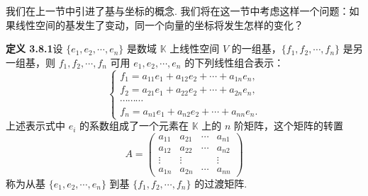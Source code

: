 \documentclass[UTF8, 12pt, fontset=fandol, oneside]{ctexart}
\begin{document}
我们在上一节中引进了基与坐标的概念. 我们将在这一节中考虑这样一个问题：如果线性空间的基发生了变动，同一个向量的坐标将发生怎样的变化？

\noindent\textbf{定义 3.8.1}\quad 设 $\{e_1,e_2,\cdots,e_n\}$ 是数域 $\mathbb{K}$ 上线性空间 $V$ 的一组基，$\{f_1,f_2,\cdots,f_n\}$ 是另一组基，则 $f_1,f_2,\cdots,f_n$ 可用 $e_1,e_2,\cdots,e_n$ 的下列线性组合表示：
\begin{equation}
\left\{\begin{array}{l}
f_1=a_{11}e_1+a_{12}e_2+\cdots+a_{1n}e_n,\\
f_2=a_{21}e_1+a_{22}e_2+\cdots+a_{2n}e_n,\\
\cdots\cdots\cdots\\
f_n=a_{n1}e_1+a_{n2}e_2+\cdots+a_{nn}e_n.
\end{array}\right.
\tag{3.8.1}
\end{equation}
上述表示式中 $e_i$ 的系数组成了一个元素在 $\mathbb{K}$ 上的 $n$ 阶矩阵，这个矩阵的转置
\[
A=\left(\begin{array}{cccc}
a_{11}&a_{21}&\cdots&a_{n1}\\
a_{12}&a_{22}&\cdots&a_{n2}\\
\vdots&\vdots&&\vdots\\
a_{1n}&a_{2n}&\cdots&a_{nn}
\end{array}\right)
\]
称为从基 $\{e_1,e_2,\cdots,e_n\}$ 到基 $\{f_1,f_2,\cdots,f_n\}$ 的过渡矩阵.
\end{document}
